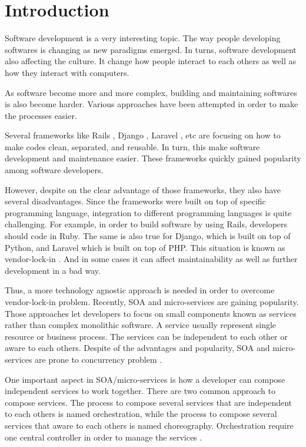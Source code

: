 \documentclass[conference]{IEEEtran}
\begin{document}
\IEEEpeerreviewmaketitle

\section{Introduction}

Software development is a very interesting topic. The way people developing softwares is changing as new paradigms emerged. In turns, software development also affecting the culture. It change how people interact to each others as well as how they interact with computers.

As software become more and more complex, building and maintaining softwares is also become harder. Various approaches have been attempted in order to make the processes easier.

Several frameworks like Rails \cite{rails}, Django \cite{django}, Laravel \cite{laravel}, etc are focusing on how to make codes clean, separated, and reusable. In turn, this make software development and maintenance easier. These frameworks quickly gained popularity among software developers.

However, despite on the clear advantage of those frameworks, they also have several disadvantages. Since the frameworks were built on top of specific programming language, integration to different programming languages is quite challenging. For example, in order to build software by using Rails, developers should code in Ruby. The same is also true for Django, which is built on top of Python, and Laravel which is built on top of PHP. This situation is known as vendor-lock-in \cite{vendorlock}. And in some cases it can affect maintainability as well as further development in a bad way.

Thus, a more technology agnostic approach is needed in order to overcome vendor-lock-in problem. Recently, SOA and micro-services are gaining popularity. Those approaches let developers to focus on small components known as services rather than complex monolithic software. A service usually represent single resource or business process. The services can be independent to each other or aware to each others. Despite of the advantages and popularity, SOA and micro-services are prone to concurrency problem \cite{soavsmicroservice}.

One important aspect in SOA/micro-services is how a developer can compose independent services to work together. There are two common approach to compose services. The process to compose several services that are independent to each others is named orchestration, while the process to compose several services that aware to each others is named choreography. Orchestration require one central controller in order to manage the services \cite{orchestrationvschoreography}.
\end{document}
